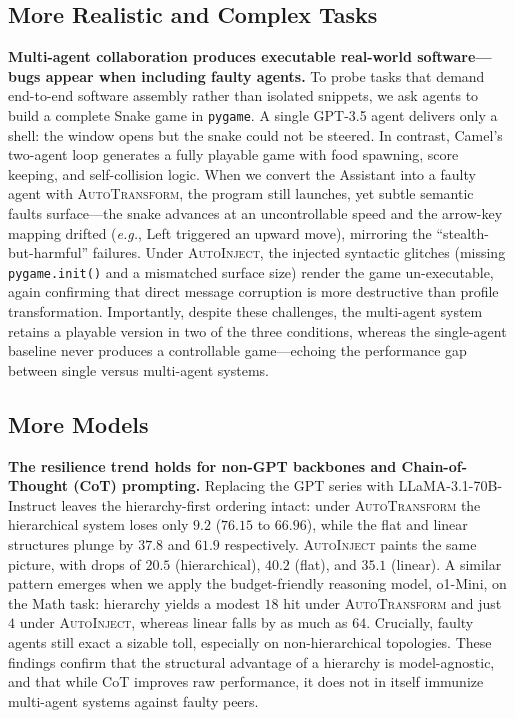\documentclass{article}
\theoremstyle{plain}
\theoremstyle{definition}
\theoremstyle{remark}
\newcommand{\eg}{\textit{e.g.}}
\begin{document}
\subsection{More Realistic and Complex Tasks}

\textbf{Multi-agent collaboration produces executable real-world software—bugs appear when including faulty agents.}
To probe tasks that demand end-to-end software assembly rather than isolated snippets, we ask agents to build a complete Snake game in \texttt{pygame}.
A single GPT-3.5 agent delivers only a shell: the window opens but the snake could not be steered.
In contrast, Camel's two-agent loop generates a fully playable game with food spawning, score keeping, and self-collision logic.
When we convert the Assistant into a faulty agent with \textsc{AutoTransform}, the program still launches, yet subtle semantic faults surface—the snake advances at an uncontrollable speed and the arrow-key mapping drifted (\eg, Left triggered an upward move), mirroring the ``stealth-but-harmful'' failures.
Under \textsc{AutoInject}, the injected syntactic glitches (missing \texttt{pygame.init()} and a mismatched surface size) render the game un-executable, again confirming that direct message corruption is more destructive than profile transformation.
Importantly, despite these challenges, the multi-agent system retains a playable version in two of the three conditions, whereas the single-agent baseline never produces a controllable game—echoing the performance gap between single versus multi-agent systems.

\subsection{More Models}

\textbf{The resilience trend holds for non-GPT backbones and Chain-of-Thought (CoT) prompting.}
Replacing the GPT series with LLaMA-3.1-70B-Instruct leaves the hierarchy-first ordering intact: under \textsc{AutoTransform} the hierarchical system loses only $9.2$ ($76.15$ to $66.96$), while the flat and linear structures plunge by $37.8$ and $61.9$ respectively.
\textsc{AutoInject} paints the same picture, with drops of $20.5$ (hierarchical), $40.2$ (flat), and $35.1$ (linear).
A similar pattern emerges when we apply the budget-friendly reasoning model, o1-Mini, on the Math task: hierarchy yields a modest $18$ hit under \textsc{AutoTransform} and just $4$ under \textsc{AutoInject}, whereas linear falls by as much as $64$.
Crucially, faulty agents still exact a sizable toll, especially on non-hierarchical topologies.
These findings confirm that the structural advantage of a hierarchy is model-agnostic, and that while CoT improves raw performance, it does not in itself immunize multi-agent systems against faulty peers.
\end{document}
